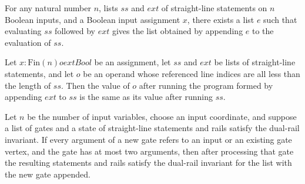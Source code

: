 \begin{theorem}
\label{BoolCircuit.StraightLine.runLines_append}
\leanok
{}
For any natural number $n$, lists $ss$ and $ext$ of straight-line statements on $n$
Boolean inputs, and a Boolean input assignment $x$, there exists a list $e$ such that
evaluating $ss$ followed by $ext$ gives the list obtained by appending $e$ to the
evaluation of $ss$.
\end{theorem}

\begin{theorem}
\label{BoolCircuit.SLOperand.eval_runLines_append}
\leanok
{}
Let $x:\text{Fin}(n)	o	ext{Bool}$ be an assignment, let $ss$ and $ext$ be lists of
straight-line statements, and let $o$ be an operand whose referenced line indices are
all less than the length of $ss$. Then the value of $o$ after running the program formed
by appending $ext$ to $ss$ is the same as its value after running $ss$.
\end{theorem}

\begin{theorem}
\label{BoolCircuit.StraightLine.dualInv_step}
\leanok
{}
Let $n$ be the number of input variables, choose an input coordinate, and suppose a list
of gates and a state of straight-line statements and rails satisfy the dual-rail
invariant. If every argument of a new gate refers to an input or an existing gate
vertex, and the gate has at most two arguments, then after processing that gate the
resulting statements and rails satisfy the dual-rail invariant for the list with the new
gate appended.
\end{theorem}

